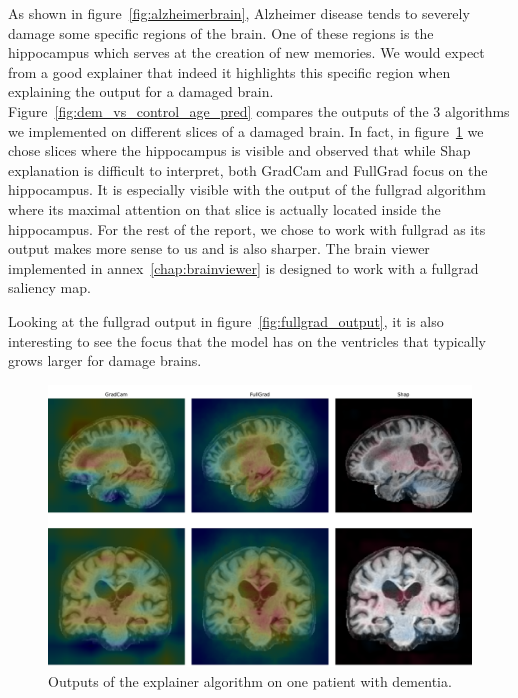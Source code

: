 As shown in figure~\ref{fig:alzheimerbrain}, Alzheimer disease tends to severely damage some specific regions of the brain. One of these regions is the hippocampus which serves at the creation of new memories. We would expect from a good explainer that indeed it highlights this specific region when explaining the output for a damaged brain. Figure~\ref{fig:dem_vs_control_age_pred} compares the outputs of the 3 algorithms we implemented on different slices of a damaged brain. In fact, in figure~\ref{fig:explainer_compared} we chose slices where the hippocampus is visible and observed that while Shap explanation is difficult to interpret, both GradCam and FullGrad focus on the hippocampus. It is especially visible with the output of the fullgrad algorithm where its maximal attention on that slice is actually located inside the hippocampus. For the rest of the report, we chose to work with fullgrad as its output makes more sense to us and is also sharper. The brain viewer implemented in annex~\ref{chap:brainviewer} is designed to work with a fullgrad saliency map.

Looking at the fullgrad output in figure~\ref{fig:fullgrad_output}, it is also interesting to see the focus that the model has on the ventricles that typically grows larger for damage brains. 



\begin{figure}
    \centering
    \includegraphics[width=0.9\linewidth]{figures/Experiements/explainer_coparaison.pdf}
    \caption{Outputs of the explainer algorithm on one patient with dementia.}
    \label{fig:explainer_compared}
\end{figure}

